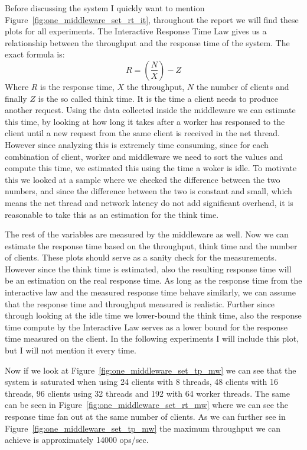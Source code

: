 \documentclass[11pt,a4paper]{article}
\begin{document}
%
Before discussing the system I quickly want to mention Figure~\ref{fig:one_middleware_set_rt_it}, throughout the report we will find these plots for all experiments.
%
The Interactive Response Time Law gives us a relationship between the throughput and the response time of the system. The exact formula is:
%
\[
R = \left(\frac{N}{X}\right) - Z
\]
%
Where $R$ is the response time, $X$ the throughput, $N$ the number of clients and finally $Z$ is the so called think time.
%
It is the time a client needs to produce another request.
%
Using the data collected inside the middleware we can estimate this time, by looking at how long it takes after a worker has responsed to the client until a new request from the same client is received in the net thread.
%
However since analyzing this is extremely time consuming, since for each combination of client, worker and middleware we need to sort the values and compute this time, we estimated this using the time a woker is idle.
%
To motivate this we looked at a sample where we checked the difference between the two numbers, and since the difference between the two is constant and small, which means the net thread and network latency do not add significant overhead, it is reasonable to take this as an estimation for the think time.
%
\par
%
The rest of the variables are measured by the middleware as well.
%
Now we can estimate the response time based on the throughput, think time and the number of clients.
%
These plots should serve as a sanity check for the measurements.
%
However since the think time is estimated, also the resulting response time will be an estimation on the real response time.
%
As long as the response time from the interactive law and the measured response time behave similarly, we can assume that the response time and throughput measured is realistic.
%
Further since through looking at the idle time we lower-bound the think time, also the response time compute by the Interactive Law serves as a lower bound for the response time measured on the client.
%
In the following experiments I will include this plot, but I will not mention it every time.
%
\par
%
Now if we look at Figure~\ref{fig:one_middleware_set_tp_mw} we can see that the system is saturated when using 24 clients with 8 threads, 48 clients with 16 threads, 96 clients using 32 threads and 192 with 64 worker threads.
%
The same can be seen in Figure~\ref{fig:one_middleware_set_rt_mw} where we can see the response time fan out at the same number of clients.
%
As we can further see in Figure~\ref{fig:one_middleware_set_tp_mw} the maximum throughput we can achieve is approximately 14000 ops/sec.
\end{document}
